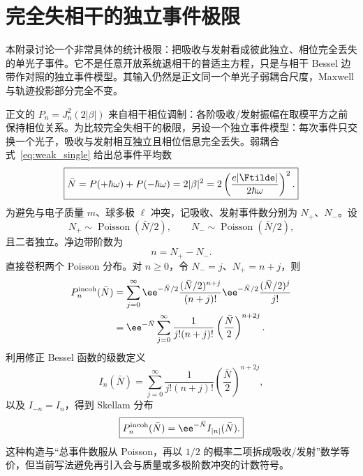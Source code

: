 \chapter{完全失相干的独立事件极限}
\label{app:incoherent-event-chapter}

\label{app:incoherent-event-model}

本附录讨论一个非常具体的统计极限：把吸收与发射看成彼此独立、相位完全丢失的单光子事件。它不是任意开放系统退相干的普适主方程，只是与相干 Bessel 边带作对照的独立事件模型。其输入仍然是正文同一个单光子弱耦合尺度，Maxwell 与轨迹投影部分完全不变。


正文的 $P_n=J_n^2(2|\beta|)$ 来自相干相位调制：各阶吸收/发射振幅在取模平方之前保持相位关系。为比较完全失相干的极限，另设一个独立事件模型：每次事件只交换一个光子，吸收与发射相互独立且相位信息完全丢失。弱耦合式~\eqref{eq:weak_single} 给出总事件平均数
\begin{equation}
\boxed{
\bar N=P(+\hbar\omega)+P(-\hbar\omega)
=2|\beta|^2
=2\left(\frac{e|\Ftilde|}{2\hbar\omega}\right)^2.}
\label{eq:Nbar-incoherent}
\end{equation}
为避免与电子质量 $m$、球多极 $\ell$ 冲突，记吸收、发射事件数分别为 $N_+$、$N_-$。设
\begin{equation}
N_+\sim\operatorname{Poisson}(\bar N/2),
\qquad
N_-\sim\operatorname{Poisson}(\bar N/2),
\end{equation}
且二者独立。净边带阶数为
\begin{equation}
n=N_+-N_-.
\end{equation}
直接卷积两个 Poisson 分布。对 $n\ge0$，令 $N_-=j$、$N_+=n+j$，则
\begin{align}
P_n^{\rm incoh}(\bar N)
&=\sum_{j=0}^{\infty}
\ee^{-\bar N/2}\frac{(\bar N/2)^{n+j}}{(n+j)!}
\ee^{-\bar N/2}\frac{(\bar N/2)^j}{j!}\\
&=\ee^{-\bar N}
\sum_{j=0}^{\infty}
\frac{1}{j!(n+j)!}
\left(\frac{\bar N}{2}\right)^{n+2j}.
\end{align}
利用修正 Bessel 函数的级数定义
\begin{equation}
I_n(\bar N)=\sum_{j=0}^{\infty}
\frac{1}{j!(n+j)!}
\left(\frac{\bar N}{2}\right)^{n+2j},
\end{equation}
以及 $I_{-n}=I_n$，得到 Skellam 分布
\begin{equation}
\boxed{
P_n^{\rm incoh}(\bar N)=\ee^{-\bar N}I_{|n|}(\bar N).}
\label{eq:Skellam}
\end{equation}
这种构造与“总事件数服从 Poisson，再以 $1/2$ 的概率二项拆成吸收/发射”数学等价，但当前写法避免再引入会与质量或多极阶数冲突的计数符号。

